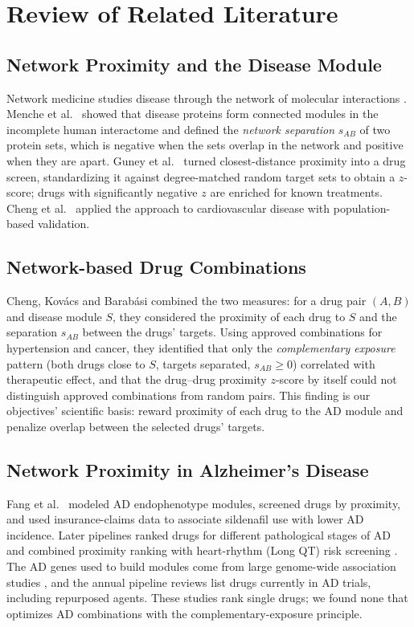 \section{Review of Related Literature}
\label{sec:rrl}

\subsection{Network Proximity and the Disease Module}

Network medicine studies disease through the network of molecular interactions \cite{barabasi2011network}. Menche et al.\ \cite{menche2015uncovering} showed that disease proteins form connected modules in the incomplete human interactome and defined the \emph{network separation} $s_{AB}$ of two protein sets, which is negative when the sets overlap in the network and positive when they are apart. Guney et al.\ \cite{guney2016network} turned closest-distance proximity into a drug screen, standardizing it against degree-matched random target sets to obtain a $z$-score; drugs with significantly negative $z$ are enriched for known treatments. Cheng et al.\ \cite{cheng2018network} applied the approach to cardiovascular disease with population-based validation.

\subsection{Network-based Drug Combinations}

Cheng, Kov\'acs and Barab\'asi \cite{cheng2019combinations} combined the two measures: for a drug pair $(A,B)$ and disease module $S$, they considered the proximity of each drug to $S$ and the separation $s_{AB}$ between the drugs' targets. Using approved combinations for hypertension and cancer, they identified that only the \emph{complementary exposure} pattern (both drugs close to $S$, targets separated, $s_{AB}\ge 0$) correlated with therapeutic effect, and that the drug--drug proximity $z$-score by itself could not distinguish approved combinations from random pairs. This finding is our objectives' scientific basis: reward proximity of each drug to the AD module and penalize overlap between the selected drugs' targets.

\subsection{Network Proximity in Alzheimer's Disease}

Fang et al.\ \cite{fang2021sildenafil} modeled AD endophenotype modules, screened drugs by proximity, and used insurance-claims data to associate sildenafil use with lower AD incidence. Later pipelines ranked drugs for different pathological stages of AD \cite{csbj2023stages} and combined proximity ranking with heart-rhythm (Long QT) risk screening \cite{lqt2025ad}. The AD genes used to build modules come from large genome-wide association studies \cite{bellenguez2022new}, and the annual pipeline reviews \cite{cummings2025pipeline,cummings2026pipeline} list drugs currently in AD trials, including repurposed agents. These studies rank single drugs; we found none that optimizes AD combinations with the complementary-exposure principle.

